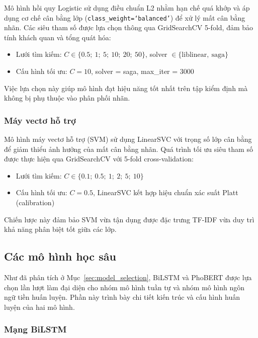 \documentclass[12pt, a4paper]{report}
\newcommand{\lrBestC}{10}               %
\newcommand{\svmBestC}{0.5}             %
\begin{document}
Mô hình hồi quy Logistic sử dụng điều chuẩn L2 nhằm hạn chế quá khớp và áp dụng cơ chế cân bằng lớp (\texttt{class\_weight=`balanced'}) để xử lý mất cân bằng nhãn. Các siêu tham số được lựa chọn thông qua GridSearchCV 5-fold, đảm bảo tính khách quan và tổng quát hóa:

\begin{itemize}[leftmargin=2em]
  \item Lưới tìm kiếm: $C \in \{0.5;\ 1;\ 5;\ 10;\ 20;\ 50\}$, solver $\in \{\text{liblinear},\ \text{saga}\}$
  \item Cấu hình tối ưu: $C = \lrBestC$, solver = saga, max\_iter = 3000
\end{itemize}

Việc lựa chọn này giúp mô hình đạt hiệu năng tốt nhất trên tập kiểm định mà không bị phụ thuộc vào phân phối nhãn.

\subsubsection{Máy vectơ hỗ trợ}

Mô hình máy vectơ hỗ trợ (SVM) sử dụng LinearSVC với trọng số lớp cân bằng để giảm thiểu ảnh hưởng của mất cân bằng nhãn. Quá trình tối ưu siêu tham số được thực hiện qua GridSearchCV với 5-fold cross-validation:

\begin{itemize}[leftmargin=2em]
  \item Lưới tìm kiếm: $C \in \{0.1;\ 0.5;\ 1;\ 2;\ 5;\ 10\}$
  \item Cấu hình tối ưu: $C = \svmBestC$, LinearSVC kết hợp hiệu chuẩn xác suất Platt~\cite{platt1999calibration} (calibration)
\end{itemize}

Chiến lược này đảm bảo SVM vừa tận dụng được đặc trưng TF-IDF vừa duy trì khả năng phân biệt tốt giữa các lớp.

\subsection{Các mô hình học sâu}

Như đã phân tích ở Mục~\ref{sec:model_selection}, BiLSTM và PhoBERT được lựa chọn lần lượt
làm đại diện cho nhóm mô hình tuần tự và nhóm mô hình ngôn ngữ tiền
huấn luyện. Phần này trình bày chi tiết kiến trúc và cấu hình huấn
luyện của hai mô hình.

\subsubsection{Mạng BiLSTM}
\end{document}
